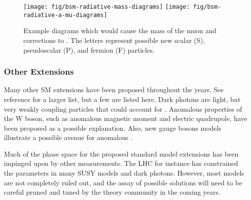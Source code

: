 \begin{figure}
\label{fig:bsm-radiative-diagrams}
\centering
\texttt{[image: fig/bsm-radiative-mass-diagrams]}
\texttt{[image: fig/bsm-radiative-a-mu-diagrams]}
\caption{Example diagrams which would cause the mass of the muon and corrections to \mugmtwo.  The letters represent possible new scalar (S), pseudoscalar (P), and fermion (F) particles.}
\end{figure}

\subsubsection{Other Extensions}

Many other SM extensions have been proposed throughout the years.  See reference \cite{a-mu-harbinger} for a larger list, but a few are listed here.  Dark photons are light, but very weakly coupling particles that could account for \mugmtwo.  Anomalous properties of the W boson, such as anomalous magnetic moment and electric quadrupole, have been proposed as a possible explanation.  Also, new gauge bosons models illustrate a possible avenue for anomalous \gmtwo.

Much of the phase space for the proposed standard model extensions has been impinged upon by other measurements.  The LHC for instance has constrained the parameters in many SUSY models and dark photons.  However, most models are not completely ruled out, and the assay of possible solutions will need to be careful pruned and tuned by the theory community in the coming years.
